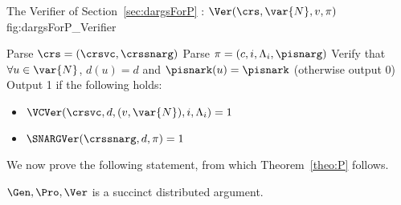 \begin{subfigures}
    \begin{nicefig}[h]{The Verifier of Section~\ref{sec:dargsForP} : $\Ver(\crs, \var{N}, v, \pi)$ }{fig:dargsForP_Verifier}
        \begin{algorithmic}[1]
            \State Parse $\crs=(\crsvc, \crssnarg)$
            \State Parse $\pi = (c, i, \Lambda_i, \pisnarg)$
            \State Verify that $\forall u\in \var{N}$, $d(u) = d$ and $\pisnark(u) = \pisnark$ (otherwise output 0)\label{step:verifyComP}
            \State Output 1 if the following holds:
            \begin{itemize}
                \item $\VCVer(\crsvc, d, (v,\var{N}), i, \Lambda_i) = 1$
                \item $\SNARGVer(\crssnarg, d, \pi) = 1$
            \end{itemize}
        \end{algorithmic}
    \end{nicefig}
\end{subfigures}


We now prove the following statement, from which Theorem~\ref{theo:P} follows.
\begin{claim}
$\Gen, \Pro, \Ver$ is a succinct distributed argument.
\end{claim}

